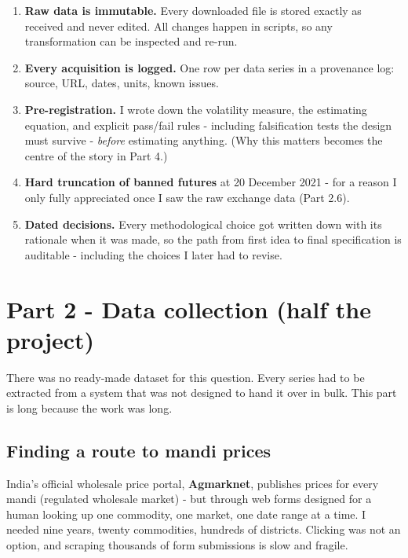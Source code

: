\documentclass[11pt]{article}
\begin{document}
\begin{enumerate}[leftmargin=1.8em,itemsep=1pt]
  \item \textbf{Raw data is immutable.} Every downloaded file is stored exactly as
        received and never edited. All changes happen in scripts, so any transformation
        can be inspected and re-run.
  \item \textbf{Every acquisition is logged.} One row per data series in a provenance log:
        source, URL, dates, units, known issues.
  \item \textbf{Pre-registration.} I wrote down the volatility measure, the estimating
        equation, and explicit pass/fail rules - including falsification tests the design
        must survive - \emph{before} estimating anything. (Why this matters becomes the
        centre of the story in Part 4.)
  \item \textbf{Hard truncation of banned futures} at 20 December 2021 - for a reason I
        only fully appreciated once I saw the raw exchange data (Part 2.6).
  \item \textbf{Dated decisions.} Every methodological choice got written down with its
        rationale when it was made, so the path from first idea to final specification is
        auditable - including the choices I later had to revise.
\end{enumerate}

\section{Part 2 - Data collection (half the project)}

There was no ready-made dataset for this question. Every series had to be extracted from
a system that was not designed to hand it over in bulk. This part is long because the
work was long.

\subsection{Finding a route to mandi prices}

India's official wholesale price portal, \textbf{Agmarknet}, publishes prices for every
mandi (regulated wholesale market) - but through web forms designed for a human looking up
one commodity, one market, one date range at a time. I needed nine years, twenty
commodities, hundreds of districts. Clicking was not an option, and scraping thousands of
form submissions is slow and fragile.
\end{document}
